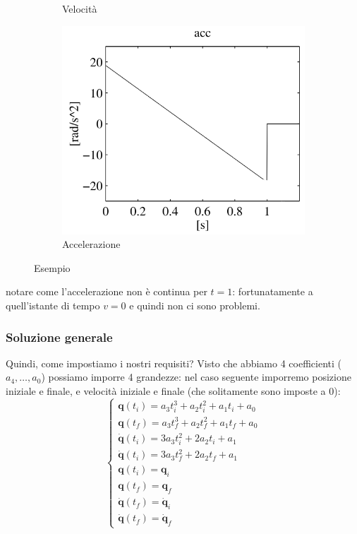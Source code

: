 \begin{figure}[H]
\begin{subfigure}{0.3\linewidth}
		\caption{Velocità}
		\label{fig:trajectories5}
	\end{subfigure}
	\hfill
	\begin{subfigure}{0.3\linewidth}
		\centering
		\includegraphics[width=\linewidth]{images/trajectories_6}
		\caption{Accelerazione}
		\label{fig:trajectories6}
	\end{subfigure}	
	\caption{Esempio}
\end{figure}
\vspace*{-9pt}
notare come l'accelerazione non è continua per $t = 1$: fortunatamente a quell'istante di tempo $v = 0$ e quindi non ci sono problemi.



\vspace*{10pt}
\subsubsection{Soluzione generale}
Quindi, come impostiamo i nostri requisiti? Visto che abbiamo 4 coefficienti ($a_4, \dots, a_0$) possiamo imporre 4 grandezze: nel caso seguente imporremo posizione iniziale e finale, e velocità iniziale e finale (che solitamente sono imposte a $0$):
$$
\begin{cases*}
	\bm{q}(t_i) = a_3t_i^3 + a_2t_i^2 + a_1t_i + a_0 \\
	\bm{q}(t_f) = a_3t_f^3 + a_2t_f^2 + a_1t_f + a_0 \\
	\bm{\dot{q}}(t_i) = 3a_3t_i^2 + 2a_2t_i + a_1 \\
	\bm{\dot{q}}(t_i) = 3a_3t_f^2 + 2a_2t_f + a_1 \\
	\bm{q}(t_i) = \bm{q}_i \\
	\bm{q}(t_f) = \bm{q}_f \\
	\bm{\dot{q}}(t_f) = \bm{\dot{q}}_i \\
	\bm{\dot{q}}(t_f) = \bm{\dot{q}}_f
\end{cases*}
$$

